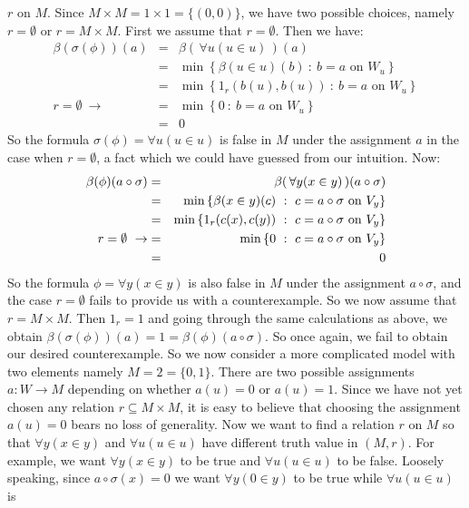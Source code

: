 $r$ on $M$. Since $M\times M=1\times 1=\{(0,0)\}$, we have two
possible choices, namely $r=\emptyset$ or $r=M\times M$. First we
assume that $r=\emptyset$. Then we have:
    \begin{eqnarray*}
    \beta(\sigma(\phi))(a)&=&\beta(\,\forall u(u\in u)\,)(a)\\
    &=&\min\left\{\beta(u\in u)(b)\ :\ b=a\mbox{\ on\ }W_{u}\right\}\\
    &=&\min\left\{1_{r}(b(u),b(u))\ :\ b=a\mbox{\ on\ }W_{u}\right\}\\
    r=\emptyset\ \rightarrow
    &=&\min\left\{0\ :\ b=a\mbox{\ on\ }W_{u}\right\}\\
    &=&0
    \end{eqnarray*}
So the formula $\sigma(\phi)=\forall u(u\in u)$ is false in $M$
under the assignment $a$ in the case when $r=\emptyset$, a fact
which we could have guessed from our intuition. Now:
    \begin{eqnarray*}
    \beta(\phi)(a\circ\sigma)&=&\beta(\,\forall y(x\in y)\,)(a\circ\sigma)\\
    &=&\min\left\{\beta(x\in y)(c)\ :\ c=a\circ\sigma\mbox{\ on\
    }V_{y}\right\}\\
    &=&\min\left\{1_{r}(c(x),c(y))\ :\ c=a\circ\sigma\mbox{\ on\
    }V_{y}\right\}\\
    r=\emptyset\ \rightarrow&=&\min\left\{0\ :\ c=a\circ\sigma\mbox{\ on\
    }V_{y}\right\}\\
    &=&0
    \end{eqnarray*}
So the formula $\phi=\forall y(x\in y)$ is also false in $M$ under
the assignment $a\circ\sigma$, and the case $r=\emptyset$ fails to
provide us with a counterexample. So we now assume that $r=M\times
M$. Then $1_{r}=1$ and going through the same calculations as above,
we obtain $\beta(\sigma(\phi))(a)=1=\beta(\phi)(a\circ\sigma)$. So
once again, we fail to obtain our desired counterexample. So we now
consider a more complicated model with two elements namely
$M=2=\{0,1\}$. There are two possible assignments $a:W\to M$
depending on whether $a(u)=0$ or $a(u)=1$. Since we have not yet
chosen any relation $r\subseteq M\times M$, it is easy to believe
that choosing the assignment $a(u)=0$ bears no loss of generality.
Now we want to find a relation $r$ on $M$ so that $\forall y(x\in
y)$ and $\forall u(u\in u)$ have different truth value in $(M,r)$.
For example, we want $\forall y(x\in y)$ to be true and $\forall
u(u\in u)$ to be false. Loosely speaking, since $a\circ\sigma(x)=0$
we want $\forall y(0\in y)$ to be true while $\forall u(u\in u)$ is
